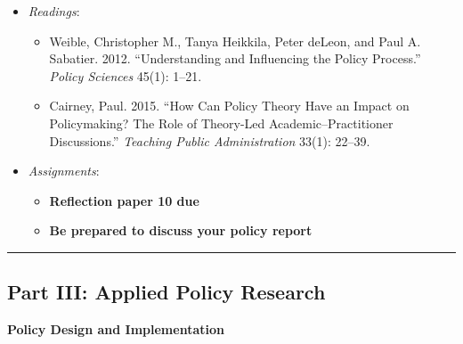 \begin{itemize}

\item
  \emph{Readings}:

  \begin{itemize}
  
  \item
    Weible, Christopher M., Tanya Heikkila, Peter deLeon, and Paul A.
    Sabatier. 2012. ``Understanding and Influencing the Policy
    Process.'' \emph{Policy Sciences} 45(1): 1--21.
  \item
    Cairney, Paul. 2015. ``How Can Policy Theory Have an Impact on
    Policymaking? The Role of Theory-Led Academic--Practitioner
    Discussions.'' \emph{Teaching Public Administration} 33(1): 22--39.
  \end{itemize}
\item
  \emph{Assignments}:

  \begin{itemize}
  
  \item
    \textbf{‌Reflection paper 10 due}
  \item
    \textbf{Be prepared to discuss your policy report}
  \end{itemize}
\end{itemize}

\begin{center}\rule{0.5\linewidth}{0.5pt}\end{center}

\hypertarget{part-iii-applied-policy-research}{%
\subsection{Part III: Applied Policy
Research}\label{part-iii-applied-policy-research}}

\week \textbf{Policy Design and Implementation}

